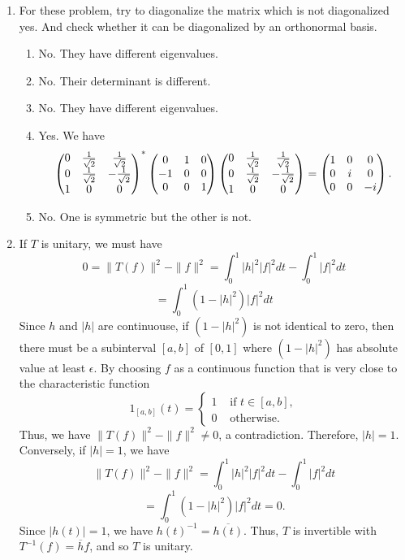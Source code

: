\begin{enumerate}
\item For these problem, try to diagonalize the matrix which is not diagonalized yes. And check whether it can be diagonalized by an orthonormal basis.
\begin{enumerate}
\item No. They have different eigenvalues.
\item No. Their determinant is different.
\item No. They have different eigenvalues.
\item Yes. We have 
\[\begin{pmatrix}0&\frac{1}{\sqrt{2}}&\frac{1}{\sqrt{2}}\\0&\frac{1}{\sqrt{2}}&-\frac{1}{\sqrt{2}}\\1&0&0\end{pmatrix}^*\begin{pmatrix}0 & 1 & 0\cr -1 & 0 & 0\cr 0 & 0 & 1\end{pmatrix}\begin{pmatrix}0&\frac{1}{\sqrt{2}}&\frac{1}{\sqrt{2}}\\0&\frac{1}{\sqrt{2}}&-\frac{1}{\sqrt{2}}\\1&0&0\end{pmatrix}=\begin{pmatrix}1 & 0 & 0\cr 0 & i & 0\cr 0 & 0 & -i\end{pmatrix}.\]
\item No. One is symmetric but the other is not.
\end{enumerate}
\item If $T$ is unitary, we must have 
\[0=\|T(f)\|^2-\|f\|^2=\int_0^1{|h|^2|f|^2dt}-\int_0^1{|f|^2dt}\]
\[=\int_0^1{(1-|h|^2)|f|^2dt}\]
Since $h$ and $|h|$ are continuouse, if $(1 - |h|^2)$ is not identical to zero, then there must be a subinterval $[a,b]$ of $[0,1]$ where $(1 - |h|^2)$ has absolute value at least $\epsilon$.  By choosing $f$ as a continuous function that is very close to the characteristic function  
\[
    1_{[a,b]}(t) = \begin{cases} 1 & \text{ if } t \in [a,b], \\ 
                               0 & \text{ otherwise}.
                 \end{cases}
\]
Thus, we have $\|T(f)\|^2-\|f\|^2 \neq 0$, a contradiction.  Therefore, $|h|=1$.  Conversely, if $|h|=1$, we have 
\[\|T(f)\|^2-\|f\|^2=\int_0^1{|h|^2|f|^2dt}-\int_0^1{|f|^2dt}\]
\[=\int_0^1{(1-|h|^2)|f|^2dt} = 0.\]
Since $|h(t)| = 1$, we have $h(t)^{-1} = \overline{h(t)}$.  Thus, $T$ is invertible with $T^{-1}(f) = \overline{h}f$, and so $T$ is unitary.

\end{enumerate}
